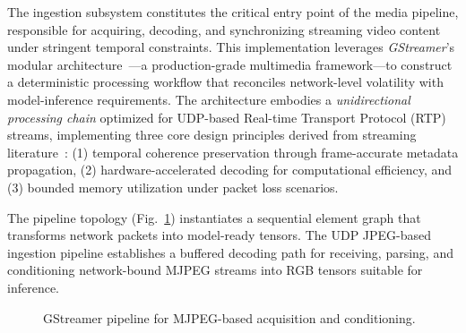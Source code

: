 The ingestion subsystem constitutes the critical entry point of the media pipeline, responsible for acquiring, decoding, and synchronizing streaming video content under stringent temporal constraints. This implementation leverages \textit{GStreamer}'s modular architecture~\cite{gstreamer1999}—a production-grade multimedia framework—to construct a deterministic processing workflow that reconciles network-level volatility with model-inference requirements. The architecture embodies a \textit{unidirectional processing chain} optimized for UDP-based Real-time Transport Protocol (RTP) streams, implementing three core design principles derived from streaming literature~\cite{BAMPIS2018218, jia2024continuous}: (1) temporal coherence preservation through frame-accurate metadata propagation, (2) hardware-accelerated decoding for computational efficiency, and (3) bounded memory utilization under packet loss scenarios.

The pipeline topology (Fig.~\ref{fig:pipeline_architecture}) instantiates a sequential element graph that transforms network packets into model-ready tensors. The UDP JPEG-based ingestion pipeline establishes a buffered decoding path for receiving, parsing, and conditioning network-bound MJPEG streams into RGB tensors suitable for inference.

\begin{figure}[h]
\centering
{}
\caption{GStreamer pipeline for MJPEG-based acquisition and conditioning.}
\label{fig:pipeline_architecture}
\end{figure}

